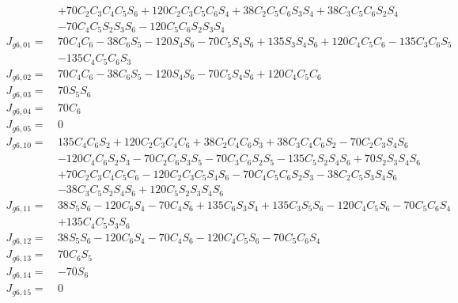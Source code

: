 \begin{equation*}
\begin{split}
			  &+ 70C_2C_3C_4C_5S_6 + 120C_2C_3C_5C_6S_4 + 38C_2C_5C_6S_3S_4 + 38C_3C_5C_6S_2S_4\\
			  &- 70C_4C_5S_2S_3S_6 - 120C_5C_6S_2S_3S_4\\
J_{g6,01} =\  &70C_4C_6 - 38C_6S_5 - 120S_4S_6 - 70C_5S_4S_6 + 135S_3S_4S_6 + 120C_4C_5C_6 - 135C_3C_6S_5\\
			  &- 135C_4C_5C_6S_3\\   
J_{g6,02} =\  &70C_4C_6 - 38C_6S_5 - 120S_4S_6 - 70C_5S_4S_6 + 120C_4C_5C_6\\
J_{g6,03} =\  &70S_5S_6\\
J_{g6,04} =\  &70C_6\\
J_{g6,05} =\  &0\\
J_{g6,10} =\  &135C_4C_6S_2 + 120C_2C_3C_4C_6 + 38C_2C_4C_6S_3 + 38C_3C_4C_6S_2 - 70C_2C_3S_4S_6\\
			  & - 120C_4C_6S_2S_3 - 70C_2C_6S_3S_5 - 70C_3C_6S_2S_5 - 135C_5S_2S_4S_6 + 70S_2S_3S_4S_6\\
			  & + 70C_2C_3C_4C_5C_6 - 120C_2C_3C_5S_4S_6 - 70C_4C_5C_6S_2S_3 - 38C_2C_5S_3S_4S_6\\
			  & - 38C_3C_5S_2S_4S_6 + 120C_5S_2S_3S_4S_6\\
J_{g6,11} =\  &38S_5S_6 - 120C_6S_4 - 70C_4S_6 + 135C_6S_3S_4 + 135C_3S_5S_6 - 120C_4C_5S_6 - 70C_5C_6S_4\\
			  & + 135C_4C_5S_3S_6\\
J_{g6,12} =\  &38S_5S_6 - 120C_6S_4 - 70C_4S_6 - 120C_4C_5S_6 - 70C_5C_6S_4\\
J_{g6,13} =\  &70C_6S_5\\
J_{g6,14} =\  &-70S_6\\
J_{g6,15} =\  &0\\
\end{split}
\end{equation*}